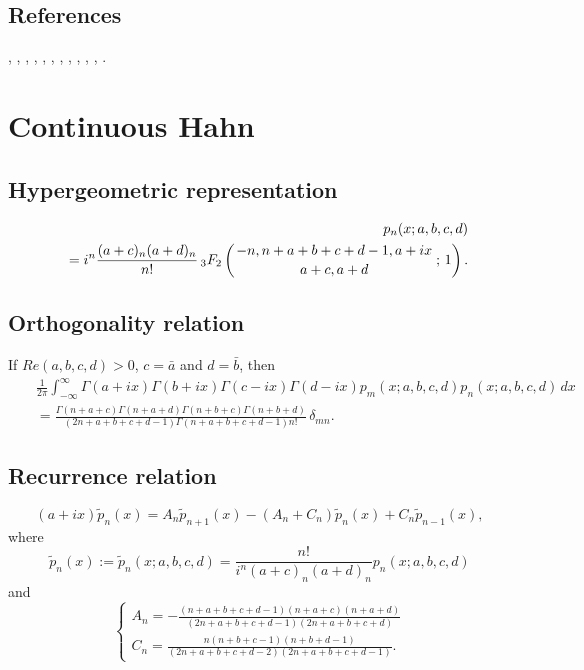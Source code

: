 \documentclass[envcountchap,graybox]{svmono}
\newcommand{\hyp}[5]{\mbox{}_{#1}{F}_{#2}
\left(\genfrac{}{}{0pt}{}{#3}{#4}\,;\,#5\right)}
\renewcommand{\Gamma}{\varGamma}
\begin{document}
\subsection*{References}
\cite{AskeyWilson85}, \cite{IsmailLetVal89}, \cite{Koorn85}, \cite{Koorn88},
\cite{Lesky94II}, \cite{Lesky95I}, \cite{Lesky95II}, \cite{Letessier84},
\cite{Letessier86}, \cite{MimachiII}, \cite{Neuman}, \cite{ValentAssche}.


\section{Continuous Hahn}

\par\setcounter{equation}{0}

\subsection*{Hypergeometric representation}
\begin{eqnarray}
\label{DefContHahn}
& &p_n(x;a,b,c,d)\nonumber\\
& &{}=i^n\frac{(a+c)_n(a+d)_n}{n!}\,\hyp{3}{2}{-n,n+a+b+c+d-1,a+ix}{a+c,a+d}{1}.
\end{eqnarray}

\subsection*{Orthogonality relation}
If $Re(a,b,c,d)>0$, $c=\bar{a}$ and $d=\bar{b}$, then
\begin{eqnarray}
\label{OrtContHahn}
& &\frac{1}{2\pi}\int_{-\infty}^{\infty}\Gamma(a+ix)\Gamma(b+ix)\Gamma(c-ix)\Gamma(d-ix)
p_m(x;a,b,c,d)p_n(x;a,b,c,d)\,dx\nonumber\\
& &{}=\frac{\Gamma(n+a+c)\Gamma(n+a+d)\Gamma(n+b+c)\Gamma(n+b+d)}
{(2n+a+b+c+d-1)\Gamma(n+a+b+c+d-1)n!}\,\delta_{mn}.
\end{eqnarray}

\subsection*{Recurrence relation}
\begin{equation}
\label{RecContHahn}
(a+ix)\tilde{p}_n(x)=A_n\tilde{p}_{n+1}(x)-\left(A_n+C_n\right)\tilde{p}_n(x)+C_n\tilde{p}_{n-1}(x),
\end{equation}
where
$$\tilde{p}_n(x):=\tilde{p}_n(x;a,b,c,d)=\frac{n!}{i^n(a+c)_n(a+d)_n}p_n(x;a,b,c,d)$$
and
$$\left\{\begin{array}{l}
\displaystyle A_n=-\frac{(n+a+b+c+d-1)(n+a+c)(n+a+d)}{(2n+a+b+c+d-1)(2n+a+b+c+d)}\\[5mm]
\displaystyle C_n=\frac{n(n+b+c-1)(n+b+d-1)}{(2n+a+b+c+d-2)(2n+a+b+c+d-1)}.
\end{array}\right.$$
\end{document}
